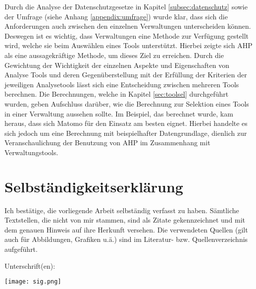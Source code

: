 Durch die Analyse der Datenschutzgesetze in Kapitel \ref{subsec:datenschutz} sowie der Umfrage (siehe Anhang \ref{appendix:umfrage}) wurde klar, dass sich die Anforderungen auch zwischen den einzelnen Verwaltungen unterscheiden können. Deswegen ist es wichtig, dass Verwaltungen eine Methode zur Verfügung gestellt wird, welche sie beim Auswählen eines Tools unterstützt. Hierbei zeigte sich AHP als eine aussagekräftige Methode, um dieses Ziel zu erreichen. Durch die Gewichtung der Wichtigkeit der einzelnen Aspekte und Eigenschaften von Analyse Tools und deren Gegenüberstellung mit der Erfüllung der Kriterien der jeweiligen Analysetools lässt sich eine Entscheidung zwischen mehreren Tools berechnen. Die Berechnungen, welche in Kapitel \ref{sec:toolsel} durchgeführt wurden, geben Aufschluss darüber, wie die Berechnung zur Selektion eines Tools in einer Verwaltung aussehen sollte. Im Beispiel, das berechnet wurde, kam heraus, dass sich Matomo für den Einsatz am besten eignet. Hierbei handelte es sich jedoch um eine Berechnung mit beispielhafter Datengrundlage, dienlich zur Veranschaulichung der Benutzung von AHP im Zusammenhang mit Verwaltungstools. 


\chapter{Selbständigkeitserklärung}

Ich bestätige, die vorliegende Arbeit selbständig verfasst zu haben. Sämtliche Textstellen, die nicht von mir stammen, sind als Zitate gekennzeichnet und mit dem genauen Hinweis auf ihre Herkunft versehen. Die verwendeten Quellen (gilt auch für Abbildungen, Grafiken u.ä.) sind im Literatur- bzw. Quellenverzeichnis aufgeführt.



Unterschrift(en):

\texttt{[image: sig.png]}
